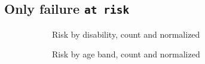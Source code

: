 \documentclass{article}
\begin{document}
\subsection{Only failure \texttt{at risk}}
\begin{figure}[h]
	\centering
	\begin{subfigure}{.45\textwidth}
		\centering
		\caption{Risk by disability, count and normalized}
		\label{fig:risk_by_dis_nowd}
	\end{subfigure}
	\begin{subfigure}{.45\textwidth}
		\centering
		\caption{Risk by age band, count and normalized}
		\label{fig:risk_by_age_nowd}
	\end{subfigure}
		\begin{subfigure}{.45\textwidth}
		\centering

\end{subfigure}
\end{figure}
\end{document}
